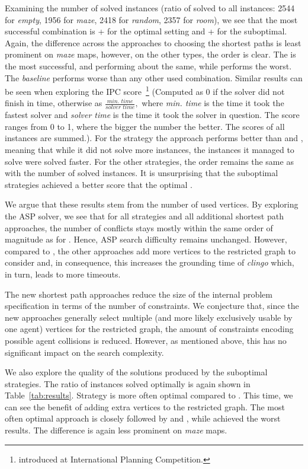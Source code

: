 Examining the number of solved instances (ratio of solved to all instances: 2544 for \emph{empty}, 1956 for \emph{maze}, 2418 for \emph{random}, 2357 for \emph{room}), we see that the most successful combination is \ssp{} + \pss{} for the optimal setting and \ssc{} + \pss{} for the suboptimal. Again, the difference across the approaches to choosing the shortest paths is least prominent on \emph{maze} maps, however, on the other types, the order is clear. The \pss{} is the most successful, \psd{} and \psr{} performing about the same, while \psa{} performs the worst. The \emph{baseline} \ssb{} performs worse than any other used combination.
Similar results can be seen when exploring the IPC score~\footnote{introduced at International Planning Competition.} (Computed as 0 if the solver did not finish in time, otherwise as $\frac{\textit{min. time}}{\textit{solver time}},$ where \textit{min. time} is the time it took the fastest solver and \textit{solver time} is the time it took the solver in question. The score ranges from 0 to 1, where the bigger the number the better. The scores of all instances are summed.). For the \ssp{} strategy the \psa{} approach performs better than \psd{} and \psr{}, meaning that while it did not solve more instances, the instances it managed to solve were solved faster. For the other strategies, the order remains the same as with the number of solved instances. It is unsurprising that the suboptimal strategies achieved a better score that the optimal \ssp{}.

We argue that these results stem from the number of used vertices. By exploring the ASP solver, we see that for all strategies and all additional shortest path approaches, the number of conflicts stays mostly within the same order of magnitude as for \pss{}. Hence, ASP search difficulty remains unchanged.
However, compared to \pss{}, the other approaches add more vertices to the restricted graph to consider and, in consequence, this increases the grounding time of \emph{clingo} which, in turn, leads to more timeouts.

The new shortest path approaches reduce the size of the internal problem specification in terms of the number of constraints.
We conjecture that, since the new approaches generally select multiple (and more likely exclusively usable by one agent) vertices for the restricted graph, the amount of constraints encoding possible agent collisions is reduced. However, as mentioned above, this has no significant impact on the search complexity.

We also explore the quality of the solutions produced by the suboptimal strategies. The ratio of instances solved optimally is again shown in Table~\ref{tab:results}. Strategy \ssc{} is more often optimal compared to \ssm{}. This time, we can see the benefit of adding extra vertices to the restricted graph. The most often optimal approach is \psa{} closely followed by \psr{} and \psd{}, while \pss{} achieved the worst results. The difference is again less prominent on \emph{maze} maps.

